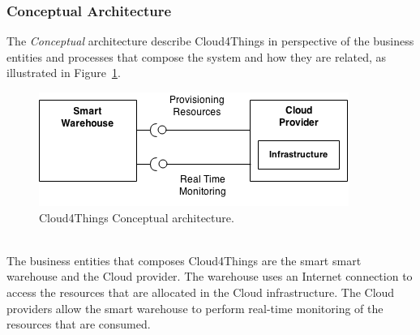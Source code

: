 \subsubsection{Conceptual Architecture}
\label{subs:conceptual_architecture}
The \textit{Conceptual} architecture describe Cloud4Things in perspective of
the business entities and processes that compose the system and how they are related,
as illustrated in Figure~\ref{fig:conceptual_architecture}.
\begin{figure}[h!]
  \centering
  \includegraphics[width=.8\textwidth]{./images/conceptual-architecture}
  \caption{Cloud4Things Conceptual architecture.}
  \label{fig:conceptual_architecture}
\end{figure}\\
The business entities that composes Cloud4Things are the smart smart warehouse and the
Cloud provider. The warehouse uses an Internet connection to access the resources
that are allocated in the Cloud infrastructure. The Cloud providers allow the smart
warehouse to perform real-time monitoring of the resources that are consumed.
